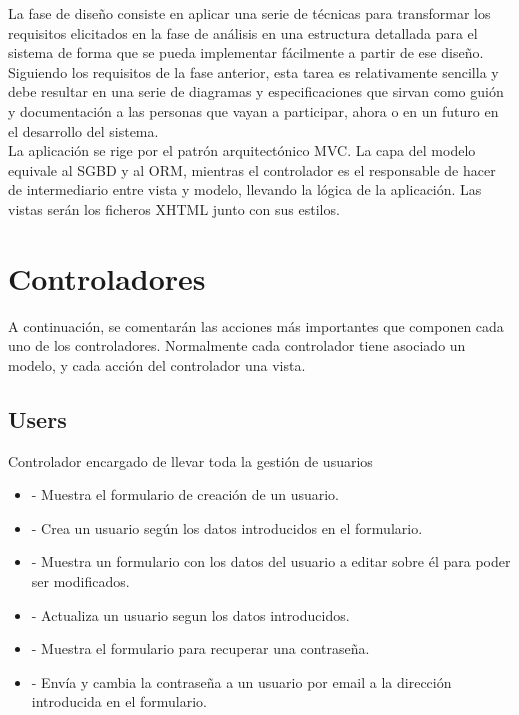 La fase de diseño consiste en aplicar una serie de técnicas para transformar los requisitos elicitados en la fase de análisis en una estructura detallada para el sistema de forma que se pueda implementar fácilmente a partir de ese diseño.\\

Siguiendo los requisitos de la fase anterior, esta tarea es relativamente sencilla y debe resultar en una serie de diagramas y especificaciones que sirvan como guión y documentación a las personas que vayan a participar, ahora o en un futuro en el desarrollo del sistema.\\

La aplicación se rige por el patrón arquitectónico MVC. La capa del modelo equivale al SGBD y al ORM, mientras el controlador es el responsable de hacer de intermediario entre vista y modelo, llevando la lógica de la aplicación. Las vistas serán los ficheros XHTML junto con sus estilos.

\section{Controladores}

A continuación, se comentarán las acciones más importantes que componen cada uno de los controladores. Normalmente cada controlador tiene asociado un modelo, y cada acción del controlador una vista.

\subsection{Users}

Controlador encargado de llevar toda la gestión de usuarios

\begin{itemize}
\item {} - Muestra el formulario de creación de un usuario.
\item {} - Crea un usuario según los datos introducidos en el formulario.
\item {} - Muestra un formulario con los datos del usuario a editar sobre él para poder ser modificados.
\item {} - Actualiza un usuario segun los datos introducidos.
\item {} - Muestra el formulario para recuperar una contraseña.
\item {} - Envía y cambia la contraseña a un usuario por email a la dirección introducida en el formulario.
\end{itemize}

